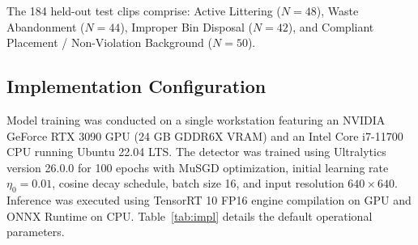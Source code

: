 \documentclass[conference]{IEEEtran}
\begin{document}
The 184 held-out test clips comprise: Active Littering ($N=48$), Waste Abandonment ($N=44$), Improper Bin Disposal ($N=42$), and Compliant Placement / Non-Violation Background ($N=50$).

\subsection{Implementation Configuration}

Model training was conducted on a single workstation featuring an NVIDIA GeForce RTX 3090 GPU (24 GB GDDR6X VRAM) and an Intel Core i7-11700 CPU running Ubuntu 22.04 LTS. The detector was trained using Ultralytics version 26.0.0 for 100 epochs with MuSGD optimization, initial learning rate $\eta_0 = 0.01$, cosine decay schedule, batch size 16, and input resolution $640 \times 640$. Inference was executed using TensorRT 10 FP16 engine compilation on GPU and ONNX Runtime on CPU. Table~\ref{tab:impl} details the default operational parameters.

\begin{table}[!t]
\centering
\caption{Implementation and Pipeline Configuration}
\label{tab:impl}
\end{table}
\end{document}
